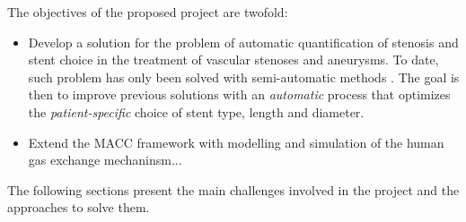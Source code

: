 % 
% 
% 



The objectives of the proposed project are twofold: 

\begin{itemize}
\item Develop a solution for the problem of automatic quantification of stenosis and stent choice in the treatment of vascular stenoses and aneurysms. To date, such problem has only been solved with semi-automatic methods \citep{Gremse01092011,Scherl200721,HERN-06b,Bemmel}. The goal is then to improve previous solutions with an {\em automatic} process that optimizes the {\em patient-specific} choice of stent type, length and diameter. 
\item Extend the MACC framework with modelling and simulation of the human gas exchange mechaninsm...

\end{itemize}


The following sections present the main challenges involved in the project and the approaches to solve them. 


